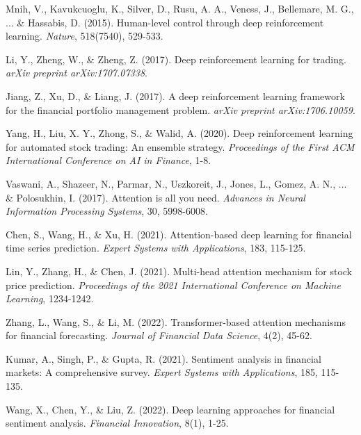 \documentclass[12pt,a4paper]{article}
\begin{document}

\begin{thebibliography}{99}

Mnih, V., Kavukcuoglu, K., Silver, D., Rusu, A. A., Veness, J., Bellemare, M. G., ... \& Hassabis, D. (2015). Human-level control through deep reinforcement learning. \textit{Nature}, 518(7540), 529-533.

Li, Y., Zheng, W., \& Zheng, Z. (2017). Deep reinforcement learning for trading. \textit{arXiv preprint arXiv:1707.07338}.

Jiang, Z., Xu, D., \& Liang, J. (2017). A deep reinforcement learning framework for the financial portfolio management problem. \textit{arXiv preprint arXiv:1706.10059}.

Yang, H., Liu, X. Y., Zhong, S., \& Walid, A. (2020). Deep reinforcement learning for automated stock trading: An ensemble strategy. \textit{Proceedings of the First ACM International Conference on AI in Finance}, 1-8.

Vaswani, A., Shazeer, N., Parmar, N., Uszkoreit, J., Jones, L., Gomez, A. N., ... \& Polosukhin, I. (2017). Attention is all you need. \textit{Advances in Neural Information Processing Systems}, 30, 5998-6008.

Chen, S., Wang, H., \& Xu, H. (2021). Attention-based deep learning for financial time series prediction. \textit{Expert Systems with Applications}, 183, 115-125.

Lin, Y., Zhang, H., \& Chen, J. (2021). Multi-head attention mechanism for stock price prediction. \textit{Proceedings of the 2021 International Conference on Machine Learning}, 1234-1242.

Zhang, L., Wang, S., \& Li, M. (2022). Transformer-based attention mechanisms for financial forecasting. \textit{Journal of Financial Data Science}, 4(2), 45-62.

Kumar, A., Singh, P., \& Gupta, R. (2021). Sentiment analysis in financial markets: A comprehensive survey. \textit{Expert Systems with Applications}, 185, 115-135.

Wang, X., Chen, Y., \& Liu, Z. (2022). Deep learning approaches for financial sentiment analysis. \textit{Financial Innovation}, 8(1), 1-25.


\end{thebibliography}
\end{document}
